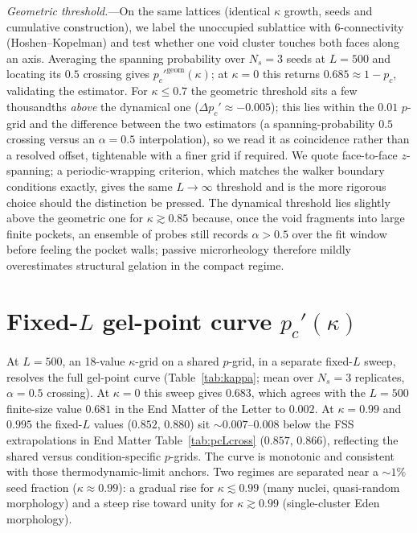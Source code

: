 \documentclass[aps,prl,onecolumn,superscriptaddress,nofootinbib,longbibliography]{revtex4-2}
\newcommand{\pc}{p_c}
\newcommand{\pcp}{p_c'}
\newcommand{\kap}{\kappa}
\begin{document}
\emph{Geometric threshold.}---On the same lattices (identical $\kap$ growth, seeds and cumulative
construction), we label the unoccupied sublattice with 6-connectivity (Hoshen--Kopelman) and test
whether one void cluster touches both faces along an axis. Averaging the spanning probability over
$N_s=3$ seeds at $L=500$ and locating its $0.5$ crossing gives $\pcp^{\mathrm{geom}}(\kap)$; at
$\kap=0$ this returns $0.685\approx1-\pc$, validating the estimator. For $\kap\le0.7$ the geometric
threshold sits a few thousandths \emph{above} the dynamical one ($\Delta\pcp\approx-0.005$); this lies
within the $0.01$ $p$-grid and the difference between the two estimators (a spanning-probability $0.5$
crossing versus an $\alpha=0.5$ interpolation), so we read it as coincidence rather than a resolved
offset, tightenable with a finer grid if required. We quote face-to-face $z$-spanning; a
periodic-wrapping criterion, which matches the walker boundary conditions exactly, gives the same
$L\to\infty$ threshold and is the more rigorous choice should the distinction be pressed. The
dynamical threshold lies slightly
above the geometric one for $\kap\gtrsim0.85$ because, once the void fragments into large finite
pockets, an ensemble of probes still records $\alpha>0.5$ over the fit window before feeling the
pocket walls; passive microrheology therefore mildly overestimates structural gelation in the compact
regime.

\section{Fixed-$L$ gel-point curve $\pcp(\kap)$}
At $L=500$, an 18-value $\kap$-grid on a shared $p$-grid, in a separate fixed-$L$ sweep,
resolves the full gel-point curve (Table~\ref{tab:kappa}; mean over $N_s=3$ replicates,
$\alpha=0.5$ crossing). At $\kap=0$ this sweep gives $0.683$, which agrees with the
$L=500$ finite-size value $0.681$ in the End Matter of the Letter to $0.002$. At
$\kap=0.99$ and $0.995$ the fixed-$L$ values ($0.852$, $0.880$) sit $\sim0.007$--$0.008$
below the FSS extrapolations in End Matter Table~\ref{tab:pcLcross} ($0.857$, $0.866$),
reflecting the shared versus condition-specific $p$-grids. The curve is monotonic and
consistent with those thermodynamic-limit anchors. Two regimes are separated near a
$\sim1\%$ seed fraction ($\kap\approx0.99$): a gradual rise for $\kap\lesssim0.99$ (many
nuclei, quasi-random morphology) and a steep rise toward unity for $\kap\gtrsim0.99$
(single-cluster Eden morphology).
\end{document}
